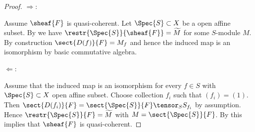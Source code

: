 \begin{proof}
$\Rightarrow$:

Assume $\sheaf{F}$ is quasi-coherent.
Let $\Spec{S}\subset X$ be a open affine subset.
By  we have $\restr{\Spec{S}}{\sheaf{F}} = \widetilde{M}$
for some $S$-module $M$.
By construction $\sect{D(f)}{F} = M_f$ and hence the induced map is an isomorphism
by basic commutative algebra.

$\Leftarrow$:

Assume that the induced map  is an isomorphism
for every $f\in S$ with $\Spec{S}\subset X$ open affine subset.
Choose collection $f_i$ such that $(f_i)=(1)$.
Then $\sect{D(f_i)}{F} = \sect{\Spec{S}}{F} \tensor_{S} S_{f_i}$ by assumption.
Hence $\restr{\Spec{S}}{F} = \widetilde{M}$
with $M = \sect{\Spec{S}}{F}$.
By  this implies that $\sheaf{F}$ is quasi-coherent.
\end{proof}